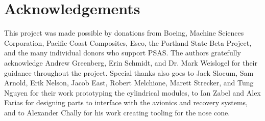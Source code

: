 \documentclass{aiaa-tc}%
\begin{document}
\section{Acknowledgements}

This project was made possible by donations from Boeing, Machine Sciences Corporation, Pacific Coast Composites, Esco, the Portland State Beta Project, and the many individual donors who support PSAS.
The authors gratefully acknowledge Andrew Greenberg, Erin Schmidt, and Dr. Mark Weislogel for their guidance throughout the project.
Special thanks also goes to Jack Slocum, Sam Arnold, Erik Nelson, Jacob East, Robert Melchione, Marett Strecker, and Tung Nguyen for their work prototyping the cylindrical modules, to Ian Zabel and Alex Farias for designing parts to interface with the avionics and recovery systems, and to Alexander Chally for his work creating tooling for the nose cone.

\end{document}
